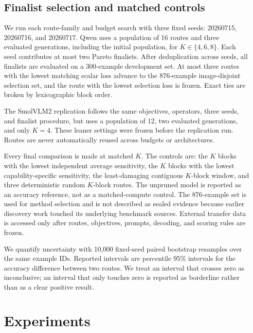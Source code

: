 \documentclass[10pt]{article}
\begin{document}
\subsection{Finalist selection and matched controls}\label{finalist-selection-and-matched-controls}

We run each route-family and budget search with three fixed seeds:
20260715, 20260716, and 20260717. Qwen uses a population of 16 routes
and three evaluated generations, including the initial population, for
\(K\in\{4,6,8\}\). Each seed contributes at most two Pareto finalists.
After deduplication across seeds, all finalists are evaluated on a
300-example development set. At most three routes with the lowest
matching scalar loss advance to the 876-example image-disjoint selection
set, and the route with the lowest selection loss is frozen. Exact ties
are broken by lexicographic block order.

The SmolVLM2 replication follows the same objectives, operators, three
seeds, and finalist procedure, but uses a population of 12, two
evaluated generations, and only \(K=4\). These leaner settings were
frozen before the replication run. Routes are never automatically reused
across budgets or architectures.

Every final comparison is made at matched \(K\). The controls are: the
\(K\) blocks with the lowest independent average sensitivity, the \(K\)
blocks with the lowest capability-specific sensitivity, the
least-damaging contiguous \(K\)-block window, and three deterministic
random \(K\)-block routes. The unpruned model is reported as an accuracy
reference, not as a matched-compute control. The 876-example set is used
for method selection and is not described as sealed evidence because
earlier discovery work touched its underlying benchmark sources.
External transfer data is accessed only after routes, objectives,
prompts, decoding, and scoring rules are frozen.

We quantify uncertainty with 10,000 fixed-seed paired bootstrap
resamples over the same example IDs. Reported intervals are percentile
95\% intervals for the accuracy difference between two routes. We treat
an interval that crosses zero as inconclusive; an interval that only
touches zero is reported as borderline rather than as a clear positive
result.

\section{Experiments}\label{experiments}
\end{document}
